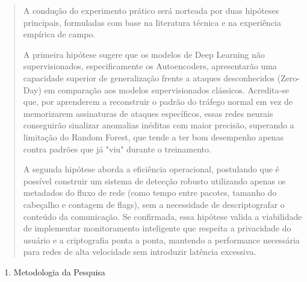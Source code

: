 \documentclass[]{article}
\begin{document}
\begin{quote}
A condução do experimento prático será norteada por duas hipóteses
principais, formuladas com base na literatura técnica e na experiência
empírica de campo.

A primeira hipótese sugere que os modelos de Deep Learning não
supervisionados, especificamente os Autoencoders, apresentarão uma
capacidade superior de generalização frente a ataques desconhecidos
(Zero-Day) em comparação aos modelos supervisionados clássicos.
Acredita-se que, por aprenderem a reconstruir o padrão do tráfego normal
em vez de memorizarem assinaturas de ataques específicos, essas redes
neurais conseguirão sinalizar anomalias inéditas com maior precisão,
superando a limitação do Random Forest, que tende a ter bom desempenho
apenas contra padrões que já "viu" durante o treinamento.

A segunda hipótese aborda a eficiência operacional, postulando que é
possível construir um sistema de detecção robusto utilizando apenas os
metadados do fluxo de rede (como tempo entre pacotes, tamanho do
cabeçalho e contagem de flags), sem a necessidade de descriptografar o
conteúdo da comunicação. Se confirmada, essa hipótese valida a
viabilidade de implementar monitoramento inteligente que respeita a
privacidade do usuário e a criptografia ponta a ponta, mantendo a
performance necessária para redes de alta velocidade sem introduzir
latência excessiva.
\end{quote}

\begin{enumerate}
\def\labelenumi{\arabic{enumi}.}
\setcounter{enumi}{3}
\item
  Metodologia da Pesquisa
\end{enumerate}
\end{document}
